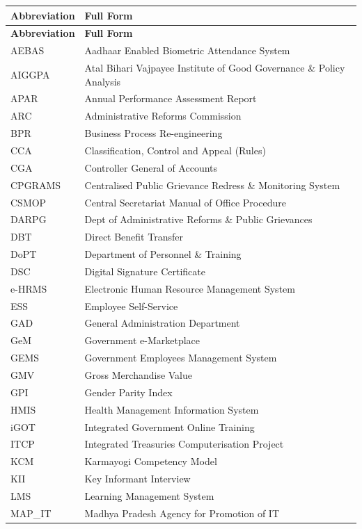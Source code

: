 \documentclass[12pt,a4paper]{article}
\begin{document}
\begin{longtable}{@{}ll@{}}
\toprule
\textbf{Abbreviation} & \textbf{Full Form} \\
\midrule
\endfirsthead
\toprule
\textbf{Abbreviation} & \textbf{Full Form} \\
\midrule
\endhead
AEBAS & Aadhaar Enabled Biometric Attendance System \\
AIGGPA & Atal Bihari Vajpayee Institute of Good Governance \& Policy Analysis \\
APAR & Annual Performance Assessment Report \\
ARC & Administrative Reforms Commission \\
BPR & Business Process Re-engineering \\
CCA & Classification, Control and Appeal (Rules) \\
CGA & Controller General of Accounts \\
CPGRAMS & Centralised Public Grievance Redress \& Monitoring System \\
CSMOP & Central Secretariat Manual of Office Procedure \\
DARPG & Dept of Administrative Reforms \& Public Grievances \\
DBT & Direct Benefit Transfer \\
DoPT & Department of Personnel \& Training \\
DSC & Digital Signature Certificate \\
e-HRMS & Electronic Human Resource Management System \\
ESS & Employee Self-Service \\
GAD & General Administration Department \\
GeM & Government e-Marketplace \\
GEMS & Government Employees Management System \\
GMV & Gross Merchandise Value \\
GPI & Gender Parity Index \\
HMIS & Health Management Information System \\
iGOT & Integrated Government Online Training \\
ITCP & Integrated Treasuries Computerisation Project \\
KCM & Karmayogi Competency Model \\
KII & Key Informant Interview \\
LMS & Learning Management System \\
MAP\_IT & Madhya Pradesh Agency for Promotion of IT \\

\end{longtable}
\end{document}
